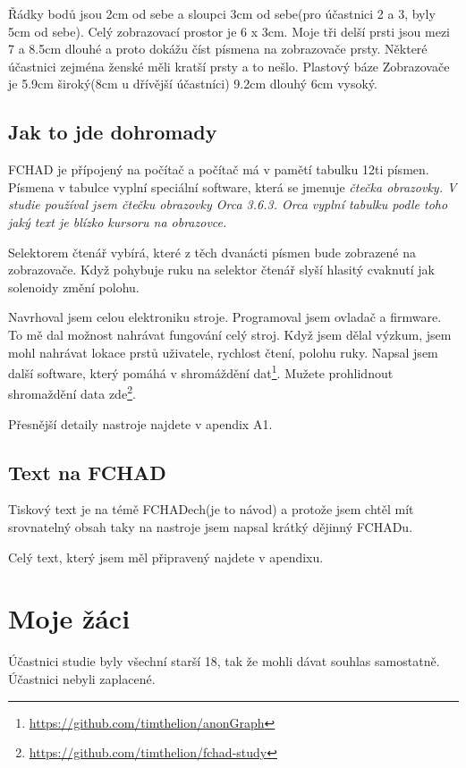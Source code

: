 Řádky bodů jsou 2cm od sebe a sloupci 3cm od sebe(pro účastnici 2 a 3, byly 5cm od sebe).  Celý zobrazovací prostor je 6 x 3cm.  Moje tři delší prsti jsou mezi 7 a 8.5cm dlouhé a proto dokážu číst písmena na zobrazovače prsty.  Některé účastnici zejména ženské měli kratší prsty a to nešlo.  Plastový báze Zobrazovače je 5.9cm široký(8cm u dřívější účastníci) 9.2cm dlouhý 6cm vysoký.

\subsection{Jak to jde dohromady}

FCHAD je přípojený na počítač a počítač má v pamětí tabulku 12ti písmen.  Písmena v tabulce vyplní speciální software, která se jmenuje \em čtečka obrazovky\em .  V studie používal jsem čtečku obrazovky Orca 3.6.3. Orca vyplní tabulku podle toho jaký text je blízko kursoru na obrazovce.

Selektorem čtenář vybírá, které z těch dvanácti písmen bude zobrazené na zobrazovače. Když pohybuje ruku na selektor čtenář slyší hlasitý cvaknutí jak solenoidy změní polohu.

Navrhoval jsem celou elektroniku stroje. Programoval jsem ovladač a firmware.  To mě dal možnost nahrávat fungování celý stroj.  Když jsem dělal výzkum, jsem mohl nahrávat lokace prstů uživatele, rychlost čtení, polohu ruky.  Napsal jsem další software, který pomáhá v shromáždění dat\footnote{\url{https://github.com/timthelion/anonGraph}}.  Mužete prohlidnout shromaždění data zde\footnote{\url{https://github.com/timthelion/fchad-study}}.

Přesnější detaily nastroje najdete v apendix A1.

\subsection{Text na FCHAD}
Tiskový text je na témě FCHADech(je to návod) a protože jsem chtěl mít srovnatelný obsah taky na nastroje jsem napsal krátký dějinný FCHADu.

Celý text, který jsem měl připravený najdete v apendixu.

\section{Moje žáci}

Účastnici studie byly všechní starší 18, tak že mohli dávat souhlas samostatně.  Účastnici nebyli zaplacené.


